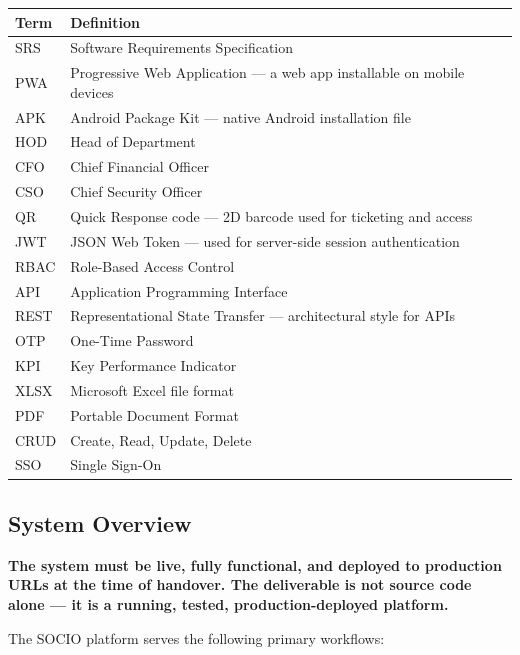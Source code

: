 \documentclass[12pt,a4paper]{article}
\begin{document}
\begin{tabularx}{\textwidth}{L{3cm} X}
\toprule
{}
\textbf{Term} & \textbf{Definition} \\
\midrule
SRS & Software Requirements Specification \\
PWA & Progressive Web Application — a web app installable on mobile devices \\
APK & Android Package Kit — native Android installation file \\
HOD & Head of Department \\
CFO & Chief Financial Officer \\
CSO & Chief Security Officer \\
QR & Quick Response code — 2D barcode used for ticketing and access \\
JWT & JSON Web Token — used for server-side session authentication \\
RBAC & Role-Based Access Control \\
API & Application Programming Interface \\
REST & Representational State Transfer — architectural style for APIs \\
OTP & One-Time Password \\
KPI & Key Performance Indicator \\
XLSX & Microsoft Excel file format \\
PDF & Portable Document Format \\
CRUD & Create, Read, Update, Delete \\
SSO & Single Sign-On \\
\bottomrule
\end{tabularx}

\subsection{System Overview}

\begin{reqbox}
\textbf{The system must be live, fully functional, and deployed to production URLs at the time of handover. The deliverable is not source code alone — it is a running, tested, production-deployed platform.}
\end{reqbox}

\vspace{0.3cm}

The SOCIO platform serves the following primary workflows:
\end{document}
